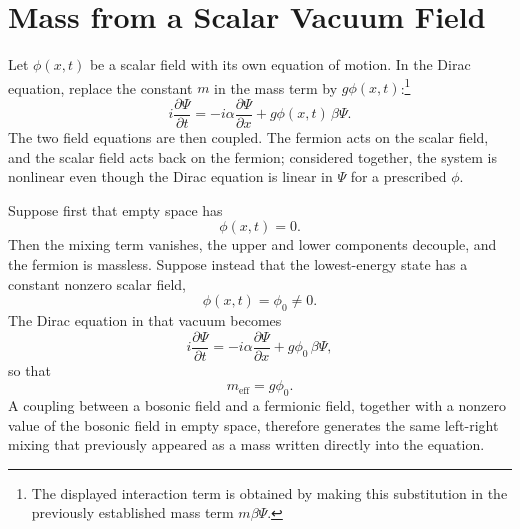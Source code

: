 \section{Mass from a Scalar Vacuum Field}

\begin{classroomqa}
\end{classroomqa}

Let \(\phi(x,t)\) be a scalar field with its own equation of motion. In the Dirac equation, replace the constant \(m\) in the mass term by \(g\phi(x,t)\):\footnote{The displayed interaction term is obtained by making this substitution in the previously established mass term \(m\beta\Psi\).}
\begin{equation}
i\frac{\partial\Psi}{\partial t}
=
-i\alpha\frac{\partial\Psi}{\partial x}
+g\phi(x,t)\,\beta\Psi.
\end{equation}
The two field equations are then coupled. The fermion acts on the scalar field, and the scalar field acts back on the fermion; considered together, the system is nonlinear even though the Dirac equation is linear in \(\Psi\) for a prescribed \(\phi\).

Suppose first that empty space has
\begin{equation}
\phi(x,t)=0.
\end{equation}
Then the mixing term vanishes, the upper and lower components decouple, and the fermion is massless. Suppose instead that the lowest-energy state has a constant nonzero scalar field,
\begin{equation}
\phi(x,t)=\phi_0\neq0.
\end{equation}
The Dirac equation in that vacuum becomes
\begin{equation}
i\frac{\partial\Psi}{\partial t}
=
-i\alpha\frac{\partial\Psi}{\partial x}
+g\phi_0\,\beta\Psi,
\end{equation}
so that
\begin{equation}
m_{\mathrm{eff}}=g\phi_0.
\end{equation}
A coupling between a bosonic field and a fermionic field, together with a nonzero value of the bosonic field in empty space, therefore generates the same left-right mixing that previously appeared as a mass written directly into the equation.

